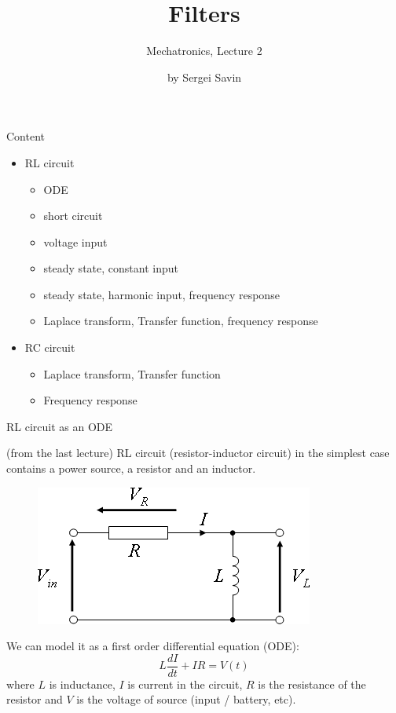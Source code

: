 \documentclass{beamer}
\title{Filters}
\subtitle{Mechatronics, Lecture 2}
\author{by Sergei Savin}
\date{\mydate}
\begin{document}
\maketitle



\begin{frame}{Content}
\begin{itemize}
\item RL circuit
\begin{itemize}
	\item ODE
	\item short circuit
	\item voltage input
	\item steady state, constant input
	\item steady state, harmonic input, frequency response
	\item Laplace transform, Transfer function, frequency response
\end{itemize}
\item RC circuit
\begin{itemize}
	\item Laplace transform, Transfer function
	\item Frequency response
\end{itemize}
\end{itemize}
\end{frame}




\begin{frame}{RL circuit as an ODE}
	\begin{flushleft}
		
		\textcolor{mygrey}{
		(from the last lecture)
		RL circuit (resistor-inductor circuit) in the simplest case contains a power source, a resistor and an inductor.
		\begin{figure}
			\centering
			\includegraphics[width=0.5\linewidth]{Series-RL}
			\label{fig:Series-RL}
		\end{figure}
		We can model it as a first order differential equation (ODE):
		\begin{equation}
			L \frac{dI}{dt} + IR = V(t)
		\end{equation}
	where $L$ is inductance, $I$ is current in the circuit, $R$ is the resistance of the resistor and $V$ is the voltage of source (input / battery, etc).
	}
		
	\end{flushleft}
\end{frame}
\end{document}
